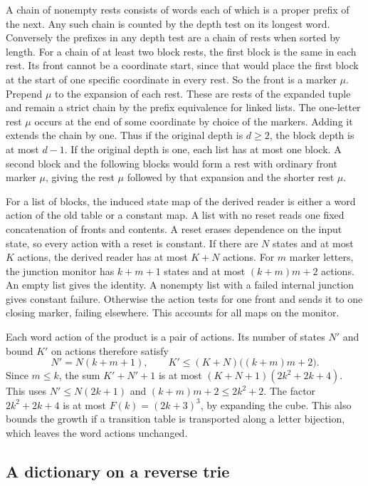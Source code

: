 A chain of nonempty rests consists of words each of which is a proper
prefix of the next. Any such chain is counted by the depth test on
its longest word. Conversely the prefixes in any depth test are a
chain of rests when sorted by length. For a chain of at least two
block rests, the first block is the same in each rest. Its front
cannot be a coordinate start, since that would place the first
block at the start of one specific coordinate in every rest. So the
front is a marker $\mu$. Prepend $\mu$ to the expansion of each rest.
These are rests of the expanded tuple and remain a strict chain
by the prefix equivalence for linked lists. The one-letter rest
$\mu$ occurs at the end of some coordinate by choice of the markers.
Adding it extends the chain by one. Thus if the original depth
is $d\ge 2$, the block depth is at most $d-1$. If the original
depth is one, each list has at most one block. A second block
and the following blocks would form a rest with ordinary front
marker $\mu$, giving the rest $\mu$ followed by that expansion
and the shorter rest $\mu$.

For a list of blocks, the induced state map of the derived reader is
either a word action of the old table or a constant map. A list
with no reset reads one fixed concatenation of fronts and contents.
A reset erases dependence on the input state, so every action with
a reset is constant. If there are $N$ states and at most $K$ actions,
the derived reader has at most $K+N$ actions. For $m$ marker letters,
the junction monitor has $k+m+1$ states and at most $(k+m)m+2$
actions. An empty list gives the identity. A nonempty list with a
failed internal junction gives constant failure. Otherwise the
action tests for one front and sends it to one closing marker,
failing elsewhere. This accounts for all maps on the monitor.

Each word action of the product is a pair of actions. Its number
of states $N'$ and bound $K'$ on actions therefore satisfy
\[
 N'=N(k+m+1),\qquad K'\le (K+N)\bigl((k+m)m+2\bigr).
\]
Since $m\le k$, the sum $K'+N'+1$ is at most
$(K+N+1)(2k^2+2k+4)$. This uses $N'\le N(2k+1)$ and
$(k+m)m+2\le 2k^2+2$. The factor $2k^2+2k+4$ is at most
$F(k)=(2k+3)^3$, by expanding the cube. This also bounds
the growth if a transition table is transported along a
letter bijection, which leaves the word actions unchanged.

\subsection{A dictionary on a reverse trie}

